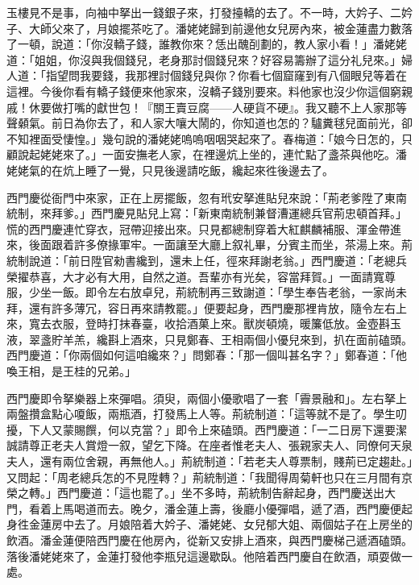 玉樓見不是事，向袖中拏出一錢銀子來，打發擡轎的去了。不一時，大妗子、二妗子、大師父來了，月娘擺茶吃了。潘姥姥歸到前邊他女兒房內來，被金蓮盡力數落了一頓，說道：「你沒轎子錢，誰教你來？恁出醜㓦劃的，教人家小看！」潘姥姥道：「姐姐，你沒與我個錢兒，老身那討個錢兒來？好容易籌辦了這分礼兒來。」婦人道：「指望問我要錢，我那裡討個錢兒與你？你看七個窟窿到有八個眼兒等着在這裡。今後你看有轎子錢便來他家來，沒轎子錢別要來。料他家也沒少你這個窮親戚！休要做打嘴的獻世包！『關王賣豆腐——人硬貨不硬』。我又聽不上人家那等𣭈聲顙氣。前日為你去了，和人家大嚷大鬧的，{}你知道也怎的？驢糞毬兒面前光，卻不知裡面受悽惶。」幾句說的潘姥姥嗚嗚咽咽哭起來了。春梅道：「娘今日怎的，只顧說起姥姥來了。」一面安撫老人家，在裡邊炕上坐的，連忙點了盞茶與他吃。潘姥姥氣的在炕上睡了一覺，只見後邊請吃飯，纔起來徃後邊去了。

西門慶從衙門中來家，正在上房擺飯，忽有玳安拏進貼兒來說：「荊老爹陞了東南統制，來拜爹。」西門慶見貼兒上寫：「新東南統制兼督漕運總兵官荊忠頓首拜。」慌的西門慶連忙穿衣，冠帶迎接出來。只見都總制穿着大紅麒麟補服、渾金帶進來，後面跟着許多僚掾軍牢。一面讓至大廳上叙礼畢，分賓主而坐，茶湯上來。荊統制說道：「前日陞官勑書纔到，還未上任，徑來拜謝老翁。」西門慶道：「老總兵榮擢恭喜，大才必有大用，自然之道。吾輩亦有光矣，容當拜賀。」一面請寬尊服，少坐一飯。即令左右放卓兒，荊統制再三致謝道：「學生奉告老翁，一家尚未拜，還有許多薄冗，容日再來請教罷。」便要起身，西門慶那裡肯放，隨令左右上來，寬去衣服，登時打抹春臺，收拾酒菓上來。獸炭頓燒，暖簾低放。金壺斟玉液，翠盞貯羊羔，纔斟上酒來，只見鄭春、王相兩個小優兒來到，扒在面前磕頭。西門慶道：「你兩個如何這咱纔來？」問鄭春：「那一個叫甚名字？」鄭春道：「他喚王相，是王桂的兄弟。」

西門慶即令拏樂器上來彈唱。須臾，兩個小優歌唱了一套「霽景融和」。左右拏上兩盤攢盒點心嗄飯，兩瓶酒，打發馬上人等。荊統制道：「這等就不是了。學生叨擾，下人又蒙賜饌，何以克當？」即令上來磕頭。西門慶道：「一二日房下還要潔誠請尊正老夫人賞燈一叙，望乞下降。在座者惟老夫人、張親家夫人、同僚何天泉夫人，還有兩位舍親，再無他人。」荊統制道：「若老夫人尊票制，賤荊已定趨赴。」又問起：「周老總兵怎的不見陞轉？」荊統制道：「我聞得周菊軒也只在三月間有京榮之轉。」西門慶道：「這也罷了。」坐不多時，荊統制告辭起身，西門慶送出大門，看着上馬喝道而去。晚夕，潘金蓮上壽，後廳小優彈唱，遞了酒，西門慶便起身徃金蓮房中去了。月娘陪着大妗子、潘姥姥、女兒郁大姐、兩個姑子在上房坐的飲酒。潘金蓮便陪西門慶在他房內，從新又安排上酒來，與西門慶梯己遞酒磕頭。{}落後潘姥姥來了，金蓮打發他李瓶兒這邊歇臥。他陪着西門慶自在飲酒，頑耍做一處。

